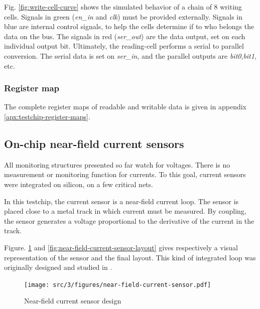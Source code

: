 Fig. \ref{fig:write-cell-curve} shows the simulated behavior of a chain of 8 writing cells.
Signals in green (\textit{en\_in} and \textit{clk}) must be provided externally.
Signals in blue are internal control signals, to help the cells determine if to who belongs the data on the bus.
The signals in red (\textit{ser\_out}) are the data output, set on each individual output bit.
Ultimately, the reading-cell performs a serial to parallel conversion.
The serial data is set on \textit{ser\_in}, and the parallel outputs are \textit{bit0},\textit{bit1}, etc.

\subsubsection{Register map}

The complete register maps of readable and writable data is given in appendix \ref{apx:testchip-register-maps}.

\subsection{On-chip near-field current sensors}

All monitoring structures presented so far watch for voltages.
There is no measurement or monitoring function for currents.
To this goal, current sensors were integrated on silicon, on a few critical nets.

In this testchip, the current sensor is a near-field current loop.
The sensor is placed close to a metal track in which current must be measured.
By coupling, the sensor generates a voltage proportional to the derivative of the current in the track.

Figure. \ref{fig:near-field-current-sensor} and \ref{fig:near-field-current-sensor-layout} gives respectively a visual representation of the sensor and the final layout.
This kind of integrated loop was originally designed and studied in \cite{AlainSallesInductors}.

\begin{figure}[!h]
  \centering
  \texttt{[image: src/3/figures/near-field-current-sensor.pdf]}
  \caption{Near-field current sensor design}
  \label{fig:near-field-current-sensor}
\end{figure}

